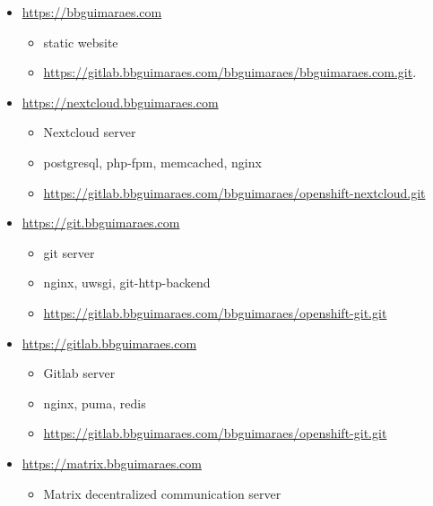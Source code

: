 \begin{itemize}[noitemsep]
    \item
        \url{https://bbguimaraes.com}
        \begin{itemize}[noitemsep]
            \item static website
            \item \url{https://gitlab.bbguimaraes.com/bbguimaraes/bbguimaraes.com.git}.
        \end{itemize}
    \item
        \url{https://nextcloud.bbguimaraes.com}
        \begin{itemize}[noitemsep]
            \item Nextcloud server
            \item postgresql, php-fpm, memcached, nginx
            \item \url{https://gitlab.bbguimaraes.com/bbguimaraes/openshift-nextcloud.git}
        \end{itemize}
    \item
        \url{https://git.bbguimaraes.com}
        \begin{itemize}[noitemsep]
            \item git server
            \item nginx, uwsgi, git-http-backend
            \item \url{https://gitlab.bbguimaraes.com/bbguimaraes/openshift-git.git}
        \end{itemize}
    \item
        \url{https://gitlab.bbguimaraes.com}
        \begin{itemize}[noitemsep]
            \item Gitlab server
            \item nginx, puma, redis
            \item \url{https://gitlab.bbguimaraes.com/bbguimaraes/openshift-git.git}
        \end{itemize}
    \item
        \url{https://matrix.bbguimaraes.com}
        \begin{itemize}[noitemsep]
            \item Matrix decentralized communication server
        \end{itemize}
\end{itemize}
